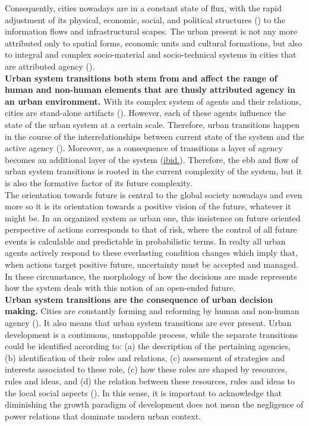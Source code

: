 \documentclass[11pt]{report}
\begin{document}
Consequently, cities nowadays are in a constant state of flux, with the rapid adjustment of its physical, economic, social, and political structures (\href{Sykola}{\cite{Sykola1999}}) to the information flows and infrastructural scapes.
The urban present is not any more attributed only to spatial forms, economic units and cultural formations, but also to integral and complex socio-material and socio-technical systems in cities that are attributed agency (\href{Farias}{\cite{FariasAndBender2011}}). 
\\

\textbf{Urban system transitions both stem from and affect the range of human and non-human elements that are thusly attributed agency in an urban environment.}
With its complex system of agents and their relations, cities are stand-alone artifacts (\href{Portugali}{\cite{Portugali2011}}).
However, each of these agents influence the state of the urban system at a certain scale. 
Therefore, urban transitions happen in the course of the interrelationships between current state of the system and the active agency (\href{Guy}{\cite{GuyAndHenneberry2000}}).
Moreover, as a consequence of transitions a layer of agency becomes an additional layer of the system (\href{Guy}{ibid.}).
Therefore, the ebb and flow of urban system transitions is rooted in the current complexity of the system, but it is also the formative factor of its future complexity.
\\

The orientation towards future is central to the global society nowadays and even more so it is its orientation towards a positive vision of the future, whatever it might be.
In an organized system as urban one, this insistence on future oriented perspective of actions corresponds to that of risk, where the control of all future events is calculable and predictable in probabilistic terms.
In realty all urban agents actively respond to these everlasting condition changes which imply that, when actions target positive future, uncertainty must be accepted and managed.
In these circumstance, the morphology of how the decisions are made represents how the system deals with this notion of an open-ended future.   
\\

\textbf{Urban system transitions are the consequence of urban decision making.}
Cities are constantly forming and reforming by human and non-human agency (\href{Portugali}{\cite{PortugaliEtAl.2012}}).
It also means that urban system transitions are ever present.
Urban development is a continuous, unstoppable process, while the separate transitions could be identified according to:
(a) the description of the pertaining agencies, (b) identification of their roles and relations, (c) assessment of strategies and interests associated to these role,
(c) how these roles are shaped by resources, rules and ideas, and
(d) the relation between these resources, rules and ideas to the local social aspects (\href{Healey}{\cite{Healey1992}}).
In this sense, it is important to acknowledge that diminishing the growth paradigm of development does not mean the negligence of power relations that dominate modern urban context. 
\\
\end{document}
